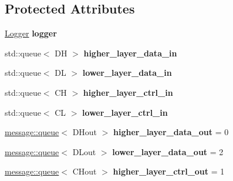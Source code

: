 \subsection*{Protected Attributes}
\begin{DoxyCompactItemize}
\item 
\hyperlink{classLogger}{Logger} {\bfseries logger}\hypertarget{classProtocol_a62d9de26edc6b3fb6a8f339bd1c87979}{}\label{classProtocol_a62d9de26edc6b3fb6a8f339bd1c87979}

\item 
std\+::queue$<$ DH $>$ {\bfseries higher\+\_\+layer\+\_\+data\+\_\+in}\hypertarget{classProtocol_a51bc76f9911caf0ddd1a2dbb2a859a94}{}\label{classProtocol_a51bc76f9911caf0ddd1a2dbb2a859a94}

\item 
std\+::queue$<$ DL $>$ {\bfseries lower\+\_\+layer\+\_\+data\+\_\+in}\hypertarget{classProtocol_a58603ff380d9566fe3403fe8748a87ab}{}\label{classProtocol_a58603ff380d9566fe3403fe8748a87ab}

\item 
std\+::queue$<$ CH $>$ {\bfseries higher\+\_\+layer\+\_\+ctrl\+\_\+in}\hypertarget{classProtocol_a96bce8402f48810faea021af43b3d760}{}\label{classProtocol_a96bce8402f48810faea021af43b3d760}

\item 
std\+::queue$<$ CL $>$ {\bfseries lower\+\_\+layer\+\_\+ctrl\+\_\+in}\hypertarget{classProtocol_a5c34f0a7166aaed640294afb1f4d71a9}{}\label{classProtocol_a5c34f0a7166aaed640294afb1f4d71a9}

\item 
\hyperlink{classmessage_1_1queue}{message\+::queue}$<$ D\+Hout $>$ {\bfseries higher\+\_\+layer\+\_\+data\+\_\+out} = 0\hypertarget{classProtocol_a6a1104489a70b06953a798a8638ca650}{}\label{classProtocol_a6a1104489a70b06953a798a8638ca650}

\item 
\hyperlink{classmessage_1_1queue}{message\+::queue}$<$ D\+Lout $>$ {\bfseries lower\+\_\+layer\+\_\+data\+\_\+out} = 2\hypertarget{classProtocol_a15b6d381ed9e96b96515b293f1acfdee}{}\label{classProtocol_a15b6d381ed9e96b96515b293f1acfdee}

\item 
\hyperlink{classmessage_1_1queue}{message\+::queue}$<$ C\+Hout $>$ {\bfseries higher\+\_\+layer\+\_\+ctrl\+\_\+out} = 1\hypertarget{classProtocol_ab14eec6d046b420a56da25367e9a9cc1}{}\label{classProtocol_ab14eec6d046b420a56da25367e9a9cc1}


\end{DoxyCompactItemize}
